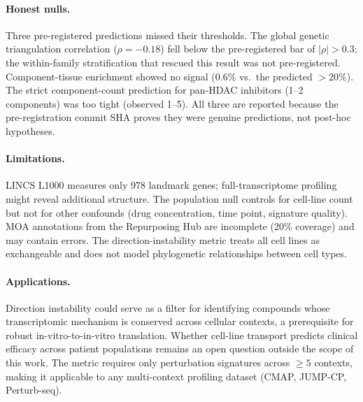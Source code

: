\documentclass{article}
\begin{document}
\paragraph{Honest nulls.}
Three pre-registered predictions missed their thresholds. The global
genetic triangulation correlation ($\rho = -0.18$) fell below the
pre-registered bar of $|\rho| > 0.3$; the within-family stratification
that rescued this result was not pre-registered. Component-tissue
enrichment showed no signal (0.6\% vs.\ the predicted $>$20\%). The
strict component-count prediction for pan-HDAC inhibitors (1--2
components) was too tight (observed 1--5). All three are reported
because the pre-registration commit SHA proves they were genuine
predictions, not post-hoc hypotheses.

\paragraph{Limitations.}
LINCS L1000 measures only 978 landmark genes; full-transcriptome profiling
might reveal additional structure. The population null controls for
cell-line count but not for other confounds (drug concentration, time point,
signature quality). MOA annotations from the Repurposing Hub are incomplete
(20\% coverage) and may contain errors. The direction-instability metric
treats all cell lines as exchangeable and does not model phylogenetic
relationships between cell types.

\paragraph{Applications.}
Direction instability could serve as a filter for identifying compounds
whose transcriptomic mechanism is conserved across cellular contexts,
a prerequisite for robust in-vitro-to-in-vitro translation. Whether
cell-line transport predicts clinical efficacy across patient populations
remains an open question outside the scope of this work. The metric
requires only perturbation signatures across $\geq5$ contexts, making
it applicable to any multi-context profiling dataset (CMAP, JUMP-CP,
Perturb-seq).



\end{document}
